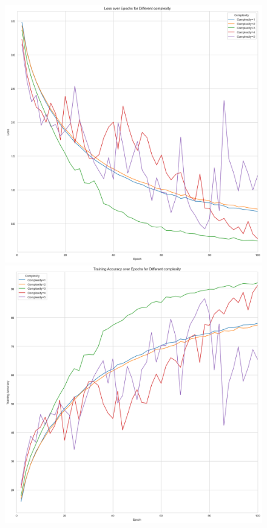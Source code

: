 \documentclass[10pt,twocolumn,letterpaper]{article}
\begin{document}
\begin{figure}[htbp]
   \centering
   \begin{minipage}[t]{0.33\textwidth}
      \centering
      \includegraphics[width=\textwidth]{Fig/12.png}
   \end{minipage}
   \begin{minipage}[t]{0.33\textwidth}
      \centering
      \includegraphics[width=\textwidth]{Fig/13.png}

\end{minipage}
\end{figure}
\end{document}
